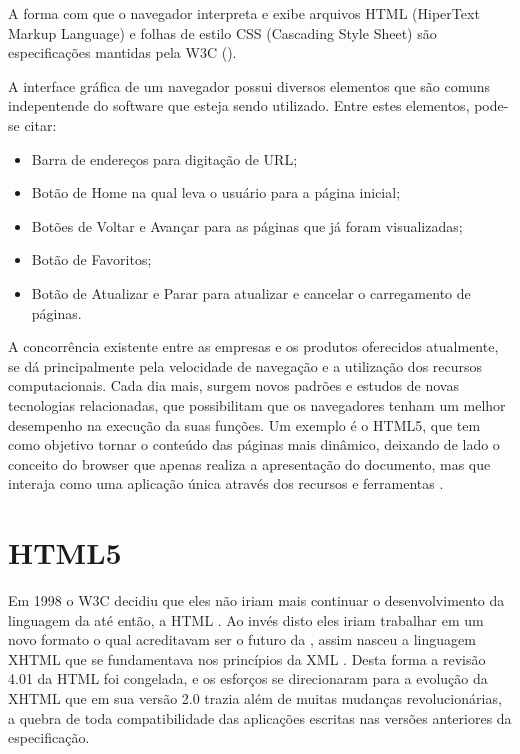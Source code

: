 \documentclass[espaco=simples,appendix=Name]{abnt}
\begin{document}
\begin{description}
A forma com que o navegador interpreta e exibe arquivos HTML (HiperText Markup Language) e folhas de estilo CSS (Cascading Style Sheet) são especificações mantidas pela W3C ().

A interface gráfica de um navegador possui diversos elementos que são comuns indepentende do software que esteja sendo utilizado. Entre estes elementos, pode-se citar: 
\begin{itemize}
	\item Barra de endereços para digitação de URL;
	\item Botão de Home na qual leva o usuário para a página inicial;
	\item Botões de Voltar e Avançar para as páginas que já foram visualizadas;
	\item Botão de Favoritos;
	\item Botão de Atualizar e Parar para atualizar e cancelar o carregamento de páginas.
\end{itemize}

A concorrência existente entre as empresas e os produtos oferecidos atualmente, se dá principalmente pela velocidade de navegação e a utilização dos recursos computacionais. Cada dia mais, surgem novos padrões e estudos de novas tecnologias relacionadas, que possibilitam que os navegadores tenham um melhor desempenho na execução da suas funções. Um exemplo é o HTML5, que tem como objetivo tornar o conteúdo das páginas mais dinâmico, deixando de lado o conceito do browser que apenas realiza a apresentação do documento, mas que interaja como uma aplicação única através dos recursos e ferramentas \cite{WebAppPlataform}.

\section{HTML5}

\item \noindent
Em 1998 o W3C decidiu que eles não iriam mais continuar o desenvolvimento da linguagem da  até então, a HTML . Ao invés disto eles iriam trabalhar em um novo formato o qual acreditavam ser o futuro da , assim nasceu a linguagem XHTML  que se fundamentava nos princípios da XML . Desta forma a revisão 4.01 da HTML foi congelada, e os esforços se direcionaram para a evolução da XHTML que em sua versão 2.0 trazia além de muitas mudanças revolucionárias, a quebra de toda compatibilidade das aplicações escritas nas versões anteriores da especificação.


\end{description}
\end{document}
